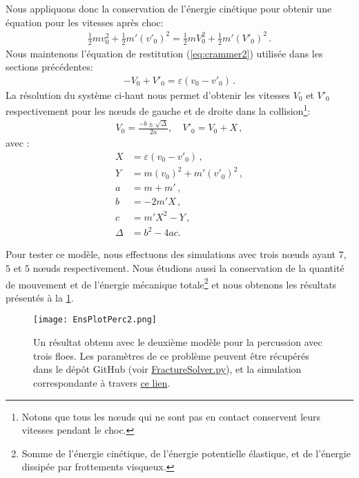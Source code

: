 \noindent Nous appliquons donc la conservation de l'énergie cinétique pour obtenir une équation pour les vitesses après choc:
\begin{align}
    \frac{1}{2}m v_0^2 + \frac{1}{2}m' (v'_0)^2 = \frac{1}{2}m V_0^2 + \frac{1}{2}m' (V'_0)^2\,.
\end{align}
Nous maintenons l'équation de restitution (\ref{eq:crammer2}) utilisée dans les sections précédentes:
\begin{align}
    - V_0 + V'_0 = \varepsilon (v_0 - v'_0) \,.
\end{align}
La résolution du système ci-haut nous permet d'obtenir les vitesses $V_0$ et $V'_0$ respectivement pour les n\oe{}uds de gauche et de droite dans la collision\footnote{Notons que tous les n\oe{}uds qui ne sont pas en contact conservent leurs vitesses pendant le choc.}:
\begin{align}
V_0 = \frac{-b \pm \sqrt{\Delta}}{2a}, \quad V'_0 = V_0 + X\,,
\end{align}
avec :
\begin{align*}
X &= \varepsilon(v_0 - v'_0)\,,\\ Y &= m(v_0)^2 + m'(v'_0)^2\,,\\  a &= m+m'\,,\\ b &= -2m'X\,,\\ c &= m'X^2 - Y \,,\\ \Delta &= b^2 - 4ac.
\end{align*}



Pour tester ce modèle, nous effectuons des simulations avec trois n\oe{}uds ayant $7$, $5$ et $5$ n\oe{}uds respectivement. Nous étudions aussi la conservation de la quantité de mouvement et de l'énergie mécanique totale\footnote{Somme de l'énergie cinétique, de l'énergie potentielle élastique, et de l'énergie dissipée par frottements visqueux.} et nous obtenons les résultats présentés à la \cref{fig:frac1d4}.
\begin{figure}[!h]
    \centering
    \texttt{[image: EnsPlotPerc2.png]}
    \caption{Un résultat obtenu avec le deuxième modèle pour la percussion avec trois floes. Les paramètres de ce problème peuvent être récupérés dans le dépôt GitHub (voir \href{https://github.com/desmond-rn/ice-floes/blob/master/code/simu1D/FractureSolver.py}{FractureSolver.py}), et la simulation correspondante à travers \href{https://seafile.unistra.fr/f/2fb0b7940de345ed9ad9/}{ce lien}.}
    \label{fig:frac1d4}
\end{figure}

